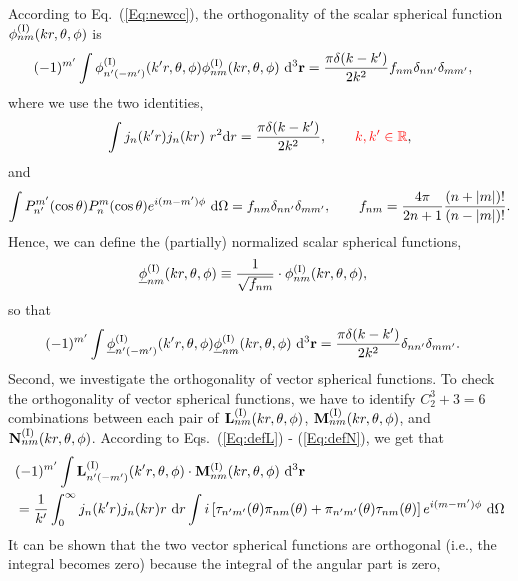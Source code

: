 \documentclass[journal=jacsat,manuscript=article,layout=traditional]{achemso}
\newcommand*\diff{\mathrm{d}}
\newcommand*\red[1]{\textcolor{red}{#1}}
\newcommand{\RomanI}{\scriptsize\textrm{I}}
\begin{document}
According to Eq.~(\ref{Eq:newcc}), the orthogonality of the scalar spherical function $\phi_{nm}^{(\RomanI)}(kr,\theta,\phi)$ is 
\begin{align}
    (-1)^{m'}\int \phi_{n'(-m')}^{(\RomanI)}(k'r,\theta,\phi)\phi_{nm}^{(\RomanI)}(kr,\theta,\phi)~\diff^3\mathbf{r}
    &= \frac{\pi\delta(k-k')}{2k^2}f_{nm}\delta_{nn'}\delta_{mm'},
    \label{Eq:scalortho}
\end{align}
where we use the two identities\cite{chew1995waves},
\begin{align}
    \label{Eq:ScalarBesselOrtho}
    \int j_n(k'r)j_n(kr)~r^2\diff r = \frac{\pi\delta(k-k')}{2k^2}, \red{\qquad k,k'\in\mathbb{R}},
\end{align}
and 
\begin{align}
    \int P_{n'}^{m'}(\cos\theta)P_n^m(\cos\theta)e^{i(m-m')\phi}~\diff\Omega=f_{nm}\delta_{nn'}\delta_{mm'},\qquad f_{nm}=\frac{4\pi}{2n+1}\frac{(n+\abs{m})!}{(n-\abs{m})!}.
\end{align}
Hence, we can define the (partially) normalized scalar spherical functions,
\begin{align}
    \underline{\phi}_{nm}^{(\RomanI)}(kr,\theta,\phi)&\equiv \frac{1}{\sqrt{f_{nm}}}\cdot\phi_{nm}^{(\RomanI)}(kr,\theta,\phi),
\end{align}
so that
\begin{align}
    (-1)^{m'}\int \underline{\phi}_{n'(-m')}^{(\RomanI)}(k'r,\theta,\phi)
    \underline{\phi}_{nm}^{(\RomanI)}(kr,\theta,\phi)~\diff^3\mathbf{r}
    &= \frac{\pi\delta(k-k')}{2k^2}\delta_{nn'}\delta_{mm'}.
\end{align}
Second, we investigate the orthogonality of vector spherical functions.
To check the orthogonality of vector spherical functions, we have to identify $C_2^3+3=6$ combinations between each pair of $\vb{L}_{nm}^{(\RomanI)}(kr,\theta,\phi)$, $\vb{M}_{nm}^{(\RomanI)}(kr,\theta,\phi)$, and $\vb{N}_{nm}^{(\RomanI)}(kr,\theta,\phi)$.
According to Eqs.~(\ref{Eq:defL}) - (\ref{Eq:defN}), we get that
\begin{align}
    \nonumber
    &(-1)^{m'}\int\vb{L}_{n'(-m')}^{(\RomanI)}(k'r,\theta,\phi)\cdot\vb{M}_{nm}^{(\RomanI)}(kr,\theta,\phi)~\diff^3\vb{r}\\
    &=
    \frac{1}{k'}\int_0^\infty j_n(k'r)j_n(kr)r~\diff{r}
    \int i
    \left[
    \tau_{n'm'}(\theta)\pi_{nm}(\theta)+
    \pi_{n'm'}(\theta)\tau_{nm}(\theta)
    \right]e^{i(m-m')\phi}~\diff\Omega
\end{align}
It can be shown that the two vector spherical functions are orthogonal (i.e., the integral becomes zero) because the integral of the angular part is zero,
\end{document}
